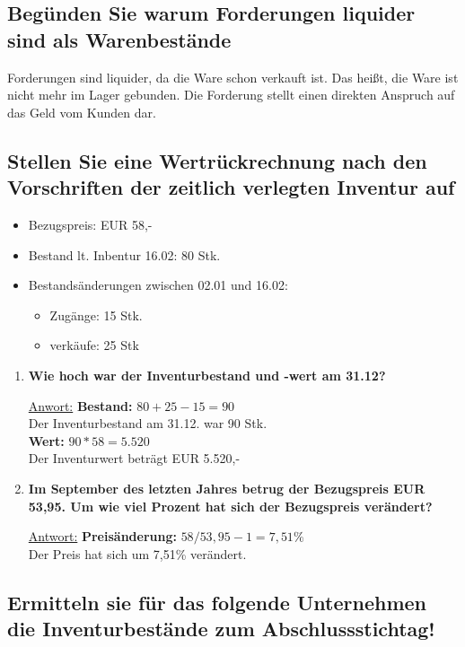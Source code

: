 \documentclass[a4paper,11pt]{scrartcl}	%
\begin{document}
	\subsection{Begünden Sie warum Forderungen liquider sind als Warenbestände}

	Forderungen sind liquider, da die Ware schon verkauft ist. Das heißt, die Ware ist nicht mehr im Lager gebunden. 
	Die Forderung stellt einen direkten Anspruch auf das Geld vom Kunden dar.

\newpage

	\subsection{Stellen Sie eine Wertrückrechnung nach den Vorschriften der zeitlich verlegten Inventur auf}

		\begin{itemize}
			\item Bezugspreis: EUR 58,- 
			\item Bestand lt. Inbentur 16.02: 80 Stk.
			\item Bestandsänderungen zwischen 02.01 und 16.02:
				\begin{itemize}
					\item Zugänge: 15 Stk.
					\item verkäufe: 25 Stk
				\end{itemize}
		\end{itemize}
			
		\begin{enumerate}
			\item \textbf{Wie hoch war der Inventurbestand und -wert am 31.12?}\par
				\underline{Anwort:} \textbf{Bestand:} $80 + 25 - 15 = 90$\\
				Der Inventurbestand am 31.12. war 90 Stk.\\
				\textbf{Wert:} $90 * 58 = 5.520$\\
				Der Inventurwert beträgt EUR 5.520,-
			\item \textbf{Im September des letzten Jahres betrug der Bezugspreis EUR 53,95. Um wie viel Prozent
				hat sich der Bezugspreis verändert?}\par
				\underline{Antwort:} \textbf{Preisänderung:} $58 / 53,95 - 1 = 7,51\%$\\
				Der Preis hat sich um 7,51\% verändert.
		\end{enumerate}

	\subsection{Ermitteln sie für das folgende Unternehmen die Inventurbestände zum Abschlussstichtag!}
\end{document}

